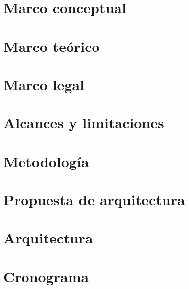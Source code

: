 \documentclass[letter,12pt]{book}
\begin{document}
  \chapter{Marco conceptual}
  
 
  \chapter{Marco teórico}
  
  
  \chapter{Marco legal}
  
  
  \chapter{Alcances y limitaciones}
  
  
  \chapter{Metodología}
  

  \chapter{Propuesta de arquitectura}
  
  
  \chapter{Arquitectura}
    
  
  
%   
  
  \chapter{Cronograma}
  
  
  
\end{document}
